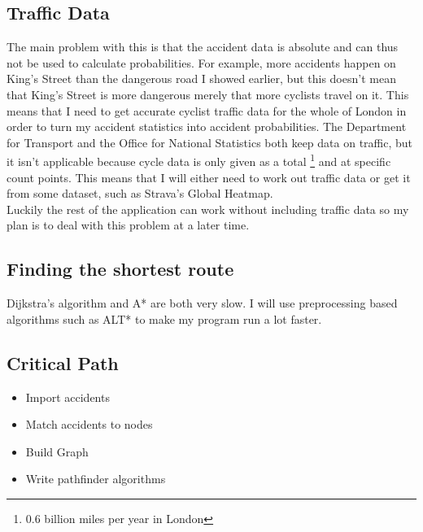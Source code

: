\subsection{Traffic Data}
The main problem with this is that the accident data is absolute and can thus not be used to calculate probabilities. For example, more accidents happen on King's Street than the dangerous road I showed earlier, but this doesn't mean that King's Street is more dangerous merely that more cyclists travel on it. This means that I need to get accurate cyclist traffic data for the whole of London in order to turn my accident statistics into accident probabilities.
The Department for Transport and the Office for National Statistics both keep data on traffic, but it isn't applicable because cycle data is only given as a total \footnote{0.6 billion miles per year in London} and at specific count points.
This means that I will either need to work out traffic data or get it from some dataset, such as Strava's Global Heatmap. \\
Luckily the rest of the application can work without including traffic data so my plan is to deal with this problem at a later time.  \label{end}
\subsection{Finding the shortest route}
Dijkstra's algorithm and A* are both very slow. I will use preprocessing based algorithms such as ALT* to make my program run a lot faster.
\subsection{Critical Path}
\begin{itemize}
    \item Import accidents
    \item Match accidents to nodes
    \item Build Graph
    \item Write pathfinder algorithms
\end{itemize}